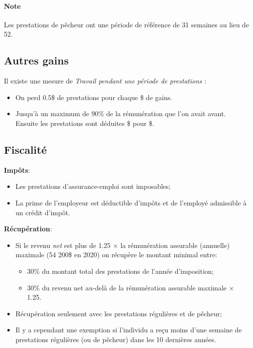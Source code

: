 \documentclass[10pt, french]{article}
\begin{document}
\begin{multicols*}{3}
\paragraph{Note}	Les prestations de pêcheur ont une période de référence de 31 semaines au lieu de 52.


\columnbreak
\subsection{Autres gains}
Il existe une mesure de \textit{Travail pendant une période de prestations} : 
\begin{itemize}
\item 	On perd 0.5\$ de prestations pour chaque \$ de gains.
\item	Jusqu'à un maximum de 90\% de la rémunération que l'on avait avant. Ensuite les prestations sont déduites \$ pour \$.
\end{itemize}


\columnbreak
\subsection{Fiscalité}
\begin{definitionNOHFILLsub}[Fiscalité]
\textbf{Impôts}:
\begin{itemize}[leftmargin = *]
	\item	Les prestations d'assurance-emploi sont imposables;
	\item	La prime de l'employeur est déductible d'impôts et de l'employé admissible à un crédit d'impôt.
\end{itemize}

\textbf{Récupération}:
\begin{itemize}[leftmargin = *]
	\item	Si le revenu \textit{net} est plus de 1.25 $\times$ la rémunération assurable (annuelle) maximale (54 200\$ en 2020) on récupère le montant minimal entre:
	\begin{itemize}[leftmargin = *]
	\item	30\% du montant total des prestations de l'année d'imposition;
	\item	30\% du revenu net au-delà de la rémunération assurable maximale $\times$ 1.25.
	\end{itemize}
	\item	 Récupération seulement avec les prestations régulières et de pêcheur;
	\item	Il y a cependant une exemption si l'individu a reçu moins d'une semaine de prestations régulières (ou de pêcheur) dans les 10 dernières années.
\end{itemize}


\end{definitionNOHFILLsub}
\end{multicols*}
\end{document}
